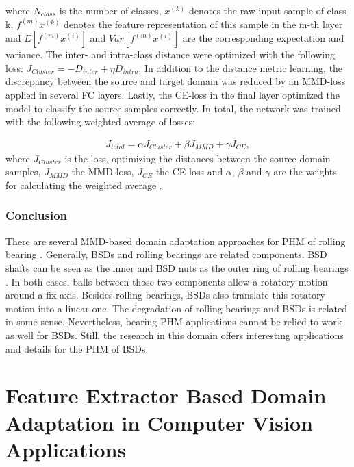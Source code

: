 where $N_{class}$ is the number of classes, $x^{(k)}$ denotes the raw input sample of class k, $f^{(m)}x^{(k)}$ denotes the feature representation of this sample in the m-th layer and $E[f^{(m)}x^{(i)}]$ and $Var[f^{(m)}x^{(i)}]$ are the corresponding expectation and variance. The inter- and intra-class distance were optimized with the following loss: $J_{Cluster} = - D_{inter} + \eta D_{intra}$. In addition to the distance metric learning, the discrepancy between the source and target domain was reduced by an MMD-loss applied in several FC layers. Lastly, the CE-loss in the final layer optimized the model to classify the source samples correctly. In total, the network was trained with the following weighted average of losses: 

\begin{equation}
    \begin{aligned}
    J_{total} = \alpha J_{Cluster} + \beta J_{MMD} + \gamma J_{CE}, 
    \end{aligned}
\end{equation}
where $J_{Cluster}$ is the loss, optimizing the distances between the source domain samples, $J_{MMD}$ the MMD-loss,  $J_{CE}$ the CE-loss and $\alpha$, $\beta$ and $\gamma$ are the weights for calculating the weighted average \cite{Li2018}.

\subsubsection{Conclusion}
There are several MMD-based domain adaptation approaches for PHM of rolling bearing \cite{AN201942} \cite{Li2018} \cite{Guo2019} \cite{Singh2019} \cite{Kang2020}. Generally, BSDs and rolling bearings are related components. BSD shafts can be seen as the inner and BSD nuts as the outer ring of rolling bearings \cite{Lee2015}. In both cases, balls between those two components allow a rotatory motion around a fix axis. Besides rolling bearings, BSDs also translate this rotatory motion into a linear one. The degradation of rolling bearings and BSDs is related in some sense. Nevertheless, bearing PHM applications cannot be relied to work as well for BSDs. Still, the research in this domain offers interesting applications and details for the PHM of BSDs. 

\section{Feature Extractor Based Domain Adaptation in Computer Vision Applications}

